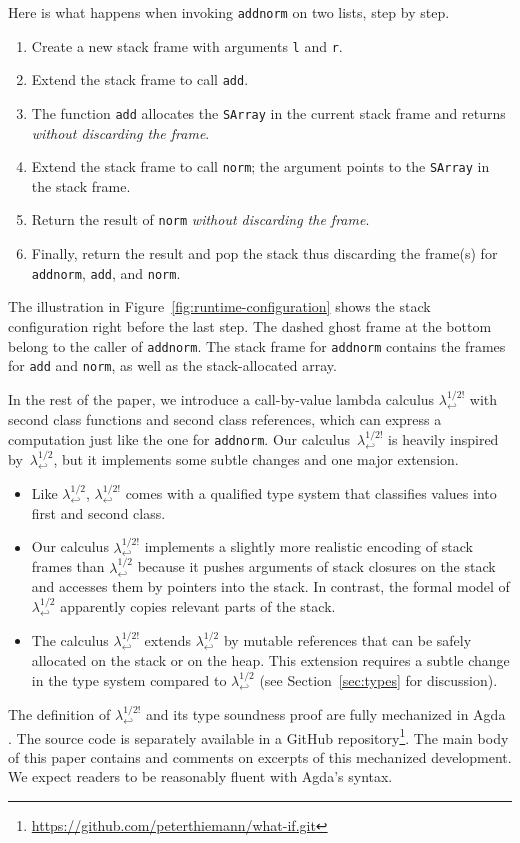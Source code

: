 \documentclass[sigplan,dvipsnames,screen]{acmart}
\newcommand{\LamWhatif}{\ensuremath{\lambda^{1/2}_{\hookleftarrow}}}
\newcommand{\LamOurs}{\ensuremath{\lambda^{1/2!}_{\hookleftarrow}}}
\begin{document}
Here is what happens when invoking \texttt{addnorm} on two lists, step by step.
\begin{enumerate}
\item Create a new stack frame with arguments \lstinline|l| and
  \lstinline|r|.
\item Extend the stack frame to call \texttt{add}.
\item The function \texttt{add} allocates the
  \texttt{SArray} in the current stack frame and returns
  \emph{without discarding the frame}.
\item Extend the stack frame to call \texttt{norm}; the argument
  points to the \texttt{SArray} in the stack frame.
\item Return the result of \texttt{norm} \emph{without discarding the
    frame}.
\item Finally, return the result and pop the stack thus discarding the frame(s) for
  \texttt{addnorm}, \texttt{add}, and \texttt{norm}.
\end{enumerate}
The illustration in Figure~\ref{fig:runtime-configuration} shows the
stack configuration right before the last step. The dashed ghost frame
at the bottom belong to the caller of \texttt{addnorm}. The stack
frame for \texttt{addnorm} contains the frames for \texttt{add} and
\texttt{norm}, as well as the stack-allocated array.

In the rest of the paper, we introduce a call-by-value lambda calculus $\LamOurs$
with second class functions and second class references, which can
express a computation just like the one for \texttt{addnorm}. Our
calculus~$\LamOurs$ is heavily inspired by~$\LamWhatif$, but it
implements some subtle changes and one major extension.

\begin{itemize}
\item Like $\LamWhatif$, $\LamOurs$ comes with a qualified type system
  that classifies values into first and second class.
\item Our calculus $\LamOurs$ implements a slightly more realistic encoding of stack frames
  than $\LamWhatif$ because it pushes arguments of stack closures on
  the stack and accesses them by pointers into the stack. In contrast, the formal model of
  $\LamWhatif$ apparently copies relevant parts of the stack.
\item The calculus $\LamOurs$ extends $\LamWhatif$ by mutable references that can
  be safely allocated on the stack or on the heap. This extension
  requires a subtle change in the type system compared to $\LamWhatif$
  (see Section~\ref{sec:types} for discussion). 
\end{itemize}
The definition of $\LamOurs$ and its type soundness proof are fully
mechanized in Agda
\cite{DBLP:conf/afp/Norell08,team25:_agda_homep}. The source code is
separately available in a GitHub
repository\footnote{\url{https://github.com/peterthiemann/what-if.git}}. 
The main body of this paper contains and comments on excerpts of this
mechanized development. We expect readers to be reasonably fluent with
Agda's syntax. 
\end{document}
